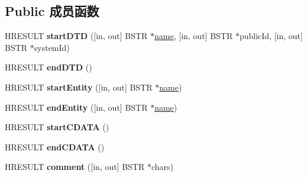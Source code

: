 \subsection*{Public 成员函数}
\begin{DoxyCompactItemize}
\item 
\mbox{\label{interface_m_s_x_m_l2_1_1_i_v_b_s_a_x_lexical_handler_a4fe6f1c475f02a3edefbf71afe5c838c}} 
H\+R\+E\+S\+U\+LT {\bfseries start\+D\+TD} (\mbox{[}in, out\mbox{]} B\+S\+TR $\ast$\hyperlink{structname}{name}, \mbox{[}in, out\mbox{]} B\+S\+TR $\ast$public\+Id, \mbox{[}in, out\mbox{]} B\+S\+TR $\ast$system\+Id)
\item 
\mbox{\label{interface_m_s_x_m_l2_1_1_i_v_b_s_a_x_lexical_handler_a13c57463536cff3611f415c6c849b865}} 
H\+R\+E\+S\+U\+LT {\bfseries end\+D\+TD} ()
\item 
\mbox{\label{interface_m_s_x_m_l2_1_1_i_v_b_s_a_x_lexical_handler_ab4feafb5e4d1f6e3b2f09828fc5771d9}} 
H\+R\+E\+S\+U\+LT {\bfseries start\+Entity} (\mbox{[}in, out\mbox{]} B\+S\+TR $\ast$\hyperlink{structname}{name})
\item 
\mbox{\label{interface_m_s_x_m_l2_1_1_i_v_b_s_a_x_lexical_handler_afc51519a1ea1746a5ea3128425f046e9}} 
H\+R\+E\+S\+U\+LT {\bfseries end\+Entity} (\mbox{[}in, out\mbox{]} B\+S\+TR $\ast$\hyperlink{structname}{name})
\item 
\mbox{\label{interface_m_s_x_m_l2_1_1_i_v_b_s_a_x_lexical_handler_aa97620e252521ce7efa16d69c94826f0}} 
H\+R\+E\+S\+U\+LT {\bfseries start\+C\+D\+A\+TA} ()
\item 
\mbox{\label{interface_m_s_x_m_l2_1_1_i_v_b_s_a_x_lexical_handler_a190fe5a696cd876e55df8bf2c6bf05e4}} 
H\+R\+E\+S\+U\+LT {\bfseries end\+C\+D\+A\+TA} ()
\item 
\mbox{\label{interface_m_s_x_m_l2_1_1_i_v_b_s_a_x_lexical_handler_a7b98e1a43862124dbae3a3a39eca6575}} 
H\+R\+E\+S\+U\+LT {\bfseries comment} (\mbox{[}in, out\mbox{]} B\+S\+TR $\ast$chars)

\end{DoxyCompactItemize}
